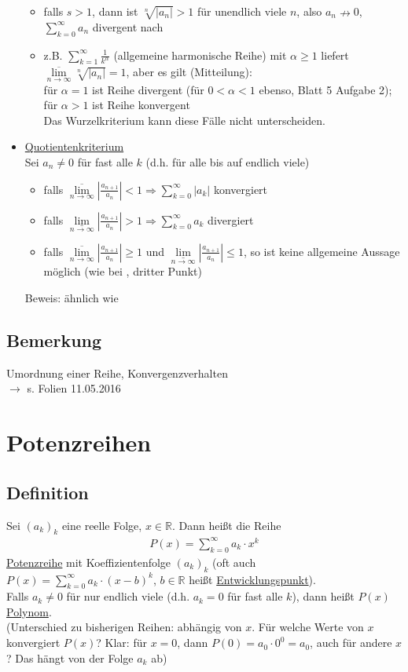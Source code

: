 \documentclass[12pt, titlepage]{article}
\newcommand{\R}{\mathds{R}}
\newcommand{\infn}{n\rightarrow\infty}
\renewcommand{\>}{\rightarrow}
\renewcommand{\*}{\cdot}
\renewcommand{\limsup}[1]{\underset{#1}{\overline{\lim}}}
\renewcommand{\liminf}[1]{\underset{#1}{\underline{\lim}}}
\begin{document}
\begin{itemize}
\begin{itemize}
		\item falls $s>1$, dann ist $\sqrt[n]{|a_n|}>1$ für unendlich viele $n$, also $a_n\nrightarrow0$, $\sum_{k=0}^{\infty}a_n$ divergent nach 
		\item z.B. $\sum_{k=1}^{\infty}\frac{1}{k^\alpha}$ (allgemeine harmonische Reihe) mit $\alpha\geq1$ liefert $\limsup{\infn}\sqrt[n]{|a_n|}=1$, aber es gilt (Mitteilung):\\
		für $\alpha=1$ ist Reihe divergent (für $0<\alpha<1$ ebenso, Blatt 5 Aufgabe 2);\\
		für $\alpha>1$ ist Reihe konvergent\\
		Das Wurzelkriterium kann diese Fälle nicht unterscheiden.
	\end{itemize}
	\item[\fbox{6b}] \underline{Quotientenkriterium}\\
	Sei $a_n\neq0$ für fast alle $k$ (d.h. für alle bis auf endlich viele)
	\begin{itemize}
		\item falls $\limsup{\infn}|\frac{a_{n+1}}{a_n}|<1\Rightarrow\sum_{k=0}^{\infty}|a_k|$ konvergiert
		\item falls $\liminf{\infn}|\frac{a_{n+1}}{a_n}|>1\Rightarrow\sum_{k=0}^{\infty}a_k$ divergiert
		\item falls $\limsup{\infn}|\frac{a_{n+1}}{a_n}|\geq1$ und $\liminf{\infn}|\frac{a_{n+1}}{a_n}|\leq1$, so ist keine allgemeine Aussage möglich (wie bei , dritter Punkt)
	\end{itemize}
	Beweis: ähnlich wie 
 \end{itemize}%
 \subsection{Bemerkung}
 Umordnung einer Reihe, Konvergenzverhalten\\
 $\>$ s. Folien 11.05.2016
 \newpage
 \section{Potenzreihen}
 \subsection{Definition}
 Sei $(a_k)_k$ eine reelle Folge, $x\in\R$. Dann heißt die Reihe
 \begin{align*}
 	P(x)=\sum_{k=0}^{\infty}a_k\*x^k
 \end{align*}
 \underline{Potenzreihe} mit Koeffizientenfolge $(a_k)_k$ (oft auch $P(x)=\sum_{k=0}^{\infty}a_k\*(x-b)^k$, $b\in\R$ heißt \underline{Entwicklungspunkt}).\\
 Falls $a_k\neq0$ für nur endlich viele (d.h. $a_k=0$ für fast alle $k$), dann heißt $P(x)$ \underline{Polynom}.\\
 (Unterschied zu bisherigen Reihen: abhängig von $x$. Für welche Werte von $x$ konvergiert $P(x)$? Klar: für $x=0$, dann $P(0)=a_0\*0^0=a_0$, auch für andere $x$? Das hängt von der Folge $a_k$ ab)
\end{document}
